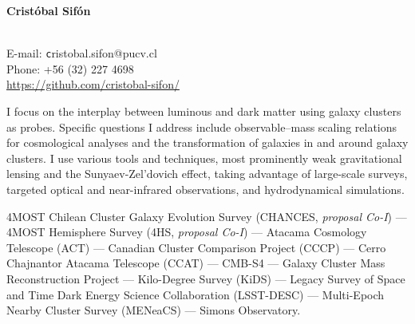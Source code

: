\documentclass[11pt]{article}
\begin{document}
\begin{minipage}[b]{0.46\linewidth}
\flushleft
\hspace{-0.7cm}
{\bf\huge Crist\'obal Sif\'on}\\\vspace{0.2cm}
\\
\end{minipage}
\begin{minipage}[b]{0.49\linewidth}
\flushright
{\large E-mail: {\texttt cristobal.sifon@pucv.cl}\\
        Phone: +56 (32) 227 4698\\
        \url{https://github.com/cristobal-sifon/}}
\end{minipage}
\vspace{0.4cm}
\hline




I focus on the interplay between luminous and dark matter using galaxy clusters as probes. Specific questions I address include observable--mass scaling relations for cosmological analyses and the transformation of galaxies in and around galaxy clusters. I use various tools and techniques, most prominently weak gravitational lensing and the Sunyaev-Zel'dovich effect, taking advantage of large-scale surveys, targeted optical and near-infrared observations, and hydrodynamical simulations.

\vspace{0.5cm}
{
 4MOST Chilean Cluster Galaxy Evolution Survey (CHANCES, \textit{proposal Co-I}) ---
 4MOST Hemisphere Survey (4HS, \textit{proposal Co-I}) ---
 Atacama Cosmology Telescope (ACT) ---
 Canadian Cluster Comparison Project (CCCP) ---
 Cerro Chajnantor Atacama Telescope (CCAT) ---
 CMB-S4 ---
 Galaxy Cluster Mass Reconstruction Project ---
 Kilo-Degree Survey (KiDS) ---
 Legacy Survey of Space and Time Dark Energy Science Collaboration (LSST-DESC) ---
 Multi-Epoch Nearby Cluster Survey (MENeaCS) ---
 Simons Observatory.
}
\end{document}
